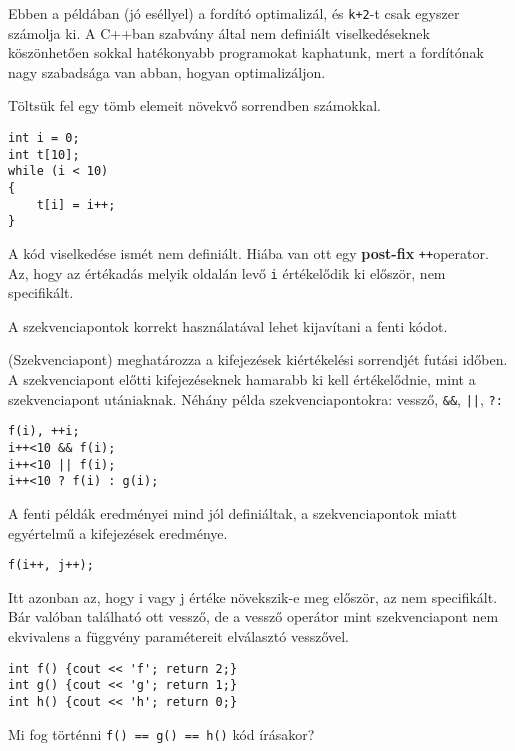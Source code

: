 \documentclass[a4paper,11.5pt,table]{article}
\begin{document}
	Ebben a példában (jó eséllyel) a fordító optimalizál, és \texttt{k+2}-t csak egyszer számolja ki. A C++ban szabvány által nem definiált viselkedéseknek köszönhetően sokkal hatékonyabb programokat kaphatunk, mert a fordítónak nagy szabadsága van abban, hogyan optimalizáljon.
	
	\begin{example}
		Töltsük fel egy tömb elemeit növekvő sorrendben számokkal.
		
		\begin{lstlisting}
int i = 0;
int t[10];
while (i < 10)
{
	t[i] = i++;
}
		\end{lstlisting}
		
		A kód viselkedése ismét nem definiált. Hiába van ott egy \textbf{post-fix} \texttt{++}\quad operator. Az, hogy az értékadás melyik oldalán levő \texttt{i} értékelődik ki először, nem specifikált.
	\end{example}
	
	A szekvenciapontok korrekt használatával lehet kijavítani a fenti kódot.
	
	\begin{definition}
		(Szekvenciapont) meghatározza a kifejezések kiértékelési sorrendjét futási időben. A szekvenciapont előtti kifejezéseknek hamarabb ki kell értékelődnie, mint a szekvenciapont utániaknak. Néhány példa szekvenciapontokra: vessző, \texttt{\&\&}, \texttt{||}, \texttt{?\quad :} 
	\end{definition}
	\begin{example}
		\begin{lstlisting}
f(i), ++i;
i++<10 && f(i);
i++<10 || f(i);
i++<10 ? f(i) : g(i);
		\end{lstlisting}
		A fenti példák eredményei mind jól definiáltak, a szekvenciapontok miatt egyértelmű a kifejezések eredménye.
		\begin{lstlisting}
f(i++, j++);
		\end{lstlisting}
		Itt azonban az, hogy i vagy j értéke növekszik-e meg először, az nem specifikált. Bár valóban található ott vessző, de a vessző operátor mint szekvenciapont nem ekvivalens a függvény paramétereit elválasztó vesszővel.
	\end{example}
	
	\begin{lstlisting}
int f() {cout << 'f'; return 2;}
int g() {cout << 'g'; return 1;}
int h() {cout << 'h'; return 0;}
	\end{lstlisting}
	Mi fog történni \texttt{f() == g() == h()} kód írásakor?
	
\end{document}
